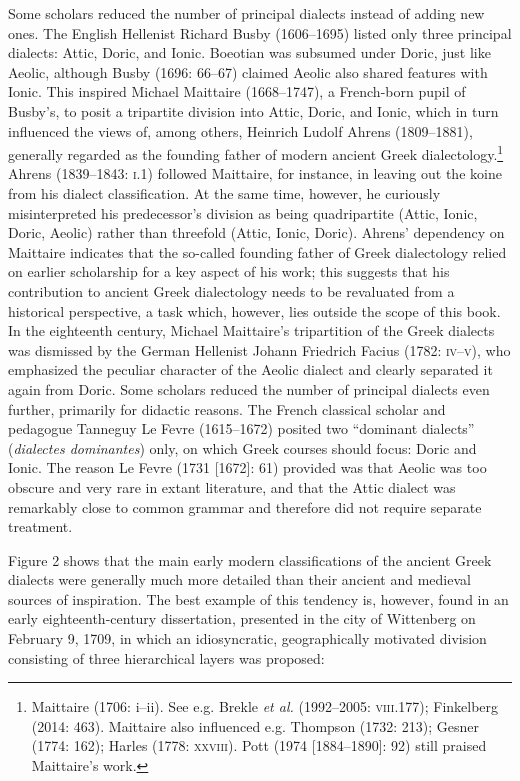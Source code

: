 \begin{styleStandard}
Some scholars reduced the number of principal dialects instead of adding new ones. The English Hellenist Richard Busby (1606–1695) listed only three principal dialects: Attic, Doric, and Ionic. Boeotian was subsumed under Doric, just like Aeolic, although Busby (1696: 66–67) claimed Aeolic also shared features with Ionic. This inspired Michael Maittaire (1668–1747), a French-born pupil of Busby’s, to posit a tripartite division into Attic, Doric, and Ionic, which in turn influenced the views of, among others, Heinrich Ludolf Ahrens (1809–1881), generally regarded as the founding father of modern ancient Greek dialectology.\footnote{ Maittaire (1706: i–ii). See e.g. Brekle \textit{et al.} (1992–2005: \textsc{viii}.177); Finkelberg (2014: 463). Maittaire also influenced e.g. Thompson (1732: 213); Gesner (1774: 162); Harles (1778: \textsc{xxviii}). Pott (1974 [1884–1890]: 92) still praised Maittaire’s work.} Ahrens (1839–1843: \textsc{i.}1) followed Maittaire, for instance, in leaving out the koine from his dialect classification. At the same time, however, he curiously misinterpreted his predecessor’s division as being quadripartite (Attic, Ionic, Doric, Aeolic) rather than threefold (Attic, Ionic, Doric). Ahrens’ dependency on Maittaire indicates that the so-called founding father of Greek dialectology relied on earlier scholarship for a key aspect of his work; this suggests that his contribution to ancient Greek dialectology needs to be revaluated from a historical perspective, a task which, however, lies outside the scope of this book. In the eighteenth century, Michael Maittaire’s tripartition of the Greek dialects was dismissed by the German Hellenist Johann Friedrich Facius (1782: \textsc{iv–v}), who emphasized the peculiar character of the Aeolic dialect and clearly separated it again from Doric. Some scholars reduced the number of principal dialects even further, primarily for didactic reasons. The French classical scholar and pedagogue Tanneguy Le Fevre (1615–1672) posited two “dominant dialects” (\textit{dialectes dominantes}) only, on which Greek courses should focus: Doric and Ionic. The reason Le Fevre (1731 [1672]: 61) provided was that Aeolic was too obscure and very rare in extant literature, and that the Attic dialect was remarkably close to common grammar and therefore did not require separate treatment.
\end{styleStandard}

\begin{styleStandard}
Figure 2 shows that the main early modern classifications of the ancient Greek dialects were generally much more detailed than their ancient and medieval sources of inspiration. The best example of this tendency is, however, found in an early eighteenth-century dissertation, presented in the city of Wittenberg on February 9, 1709, in which an idiosyncratic, geographically motivated division consisting of three hierarchical layers was proposed:
\end{styleStandard}


